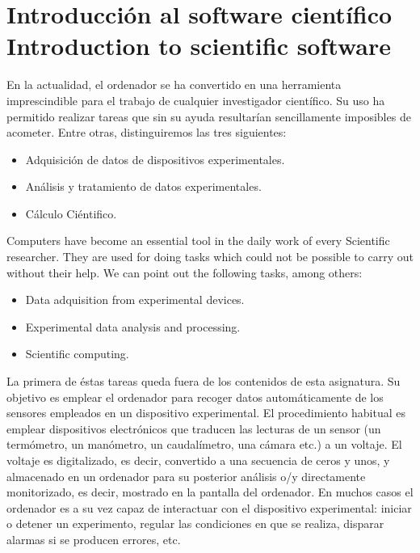 \chapter{Introducción al software científico\\ Introduction to scientific software}
\begin{paracol}{2}

En la actualidad, el ordenador se ha convertido en una herramienta imprescindible para el trabajo de cualquier investigador científico. Su uso ha permitido realizar tareas que sin su ayuda resultarían sencillamente imposibles de acometer. Entre otras, distinguiremos las tres siguientes:
\begin{itemize}
\item Adquisición de datos de dispositivos experimentales.
\item Análisis y tratamiento de datos experimentales. 
\item Cálculo Ciéntifico.
\end{itemize}
\switchcolumn
Computers have become an essential tool in the daily work of every Scientific researcher. They are used for doing tasks which could not be possible to carry out without their help. We can point out the following tasks, among others:
 \begin{itemize}
\item Data adquisition from experimental devices.
\item Experimental data analysis and processing. 
\item Scientific computing.
\end{itemize}     


\switchcolumn
La primera de éstas tareas queda fuera de los contenidos de esta asignatura. Su objetivo es emplear el ordenador para recoger datos automáticamente de los sensores empleados en un dispositivo experimental. El procedimiento habitual es emplear dispositivos electrónicos que traducen las lecturas de un sensor (un termómetro, un manómetro, un caudalímetro, una cámara etc.) a un voltaje. El voltaje es digitalizado, es decir, convertido a una secuencia de ceros y unos, y almacenado en un ordenador para su posterior análisis o/y directamente monitorizado, es decir, mostrado en la pantalla del ordenador. En muchos casos el ordenador es a su vez capaz de interactuar con el dispositivo experimental: iniciar o detener un experimento, regular las condiciones en que se realiza, disparar alarmas si se producen errores, etc.


\end{paracol}
